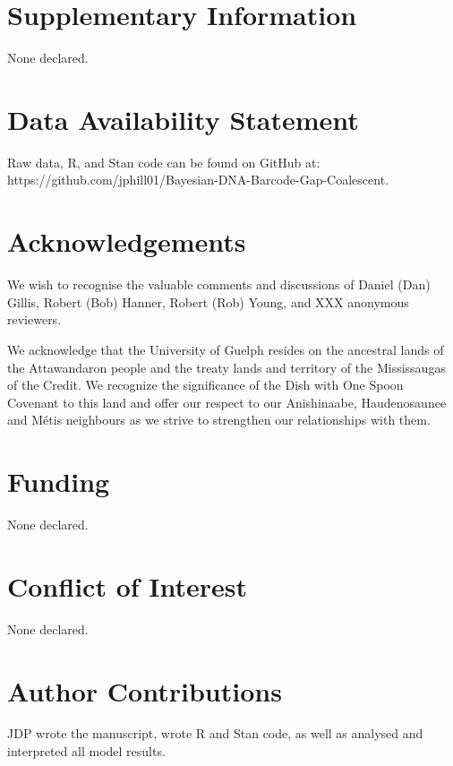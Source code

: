\documentclass[12pt]{article}
\begin{document}
\newpage

\section*{Supplementary Information}

None declared.

\section*{Data Availability Statement}

Raw data, R, and Stan code can be found on GitHub at: \\ https://github.com/jphill01/Bayesian-DNA-Barcode-Gap-Coalescent.

\section*{Acknowledgements}

We wish to recognise the valuable comments and discussions of Daniel (Dan) Gillis, Robert (Bob) Hanner, Robert (Rob) Young, and XXX anonymous reviewers.

We acknowledge that the University of Guelph resides on the ancestral lands of the Attawandaron people and the treaty lands and territory of the Mississaugas of the Credit. We recognize the significance of the Dish with One Spoon Covenant to this land and offer our respect to our Anishinaabe, Haudenosaunee and M{\'e}tis neighbours as we strive to strengthen our relationships with them.

\section*{Funding}

None declared.

\section*{Conflict of Interest}

None declared.

\section*{Author Contributions}

JDP wrote the manuscript, wrote R and Stan code, as well as analysed and interpreted all model results. 



\end{document}
